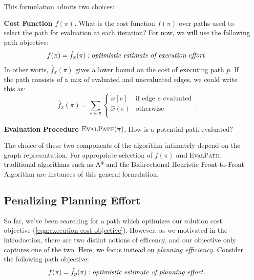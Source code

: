 This formulation admits two choices:

\textbf{Cost Function $f(\pi)$.}
What is the cost function $f(\pi)$ over paths used to select the
path for evaluation at each iteration?
For now, we will use the following path objective:
\begin{equation}
   f(\pi) = \hat{f}_x(\pi): \mbox{\emph{optimistic estimate of execution effort}}.
\end{equation}
In other worts, $\hat{f}_x(\pi)$
gives a lower bound on the cost of executing
path $p$.
If the path consists of a mix of evaluated and unevaluated edges,
we could write this as:
\begin{equation}
   \hat{f}_x(\pi) = \sum_{e \in \pi} \left\{
   \begin{array}{cl}
      x[e] & \mbox{if edge } e \mbox{ evaluated}  \\
      \hat{x}(e) & \mbox{otherwise} \\
   \end{array}
   \right.
   .
   \label{eqn:execution-cost-objective}
\end{equation}

\textbf{Evaluation Procedure $\mbox{\sc EvalPath}(\pi)$}.
How is a potential path evaluated?

The choice of these two components of the algorithm
intimately depend on the graph representation.
For appropriate selection
of $f(\pi)$ and \textsc{EvalPath},
traditional algorithms such as A* \cite{hart1968astar}
and the Bidirectional Heuristic Front-to-Front Algorithm
\cite{sint1977bhffa}
are instances of this general formulation.

\subsection{Penalizing Planning Effort}

So far, we've been searching for a path which optimizes our solution
cost objective (\ref{eqn:execution-cost-objective}).
However, as we motivated in the introduction,
there are two distint notions of efficency,
and our objective only captures one of the two.
Here, we focus instead on \emph{planning efficiency}.
Consider the following path objective:
\begin{equation}
   f(\pi) = \hat{f}_p(\pi) : \mbox{\emph{optimistic estimate of planning effort}}.
\end{equation}

